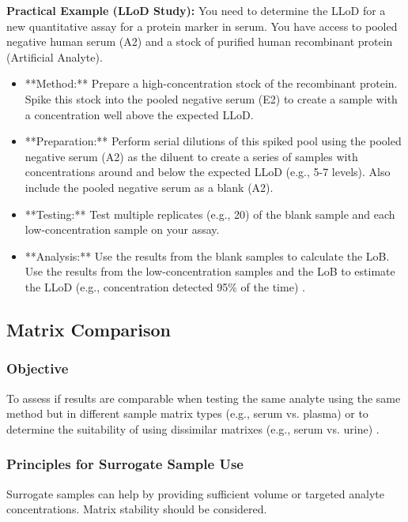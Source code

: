 \documentclass{article}
\begin{document}
\textbf{Practical Example (LLoD Study):}
You need to determine the LLoD for a new quantitative assay for a protein marker in serum. You have access to pooled negative human serum (A2) and a stock of purified human recombinant protein (Artificial Analyte).
\begin{itemize}
    \item **Method:** Prepare a high-concentration stock of the recombinant protein. Spike this stock into the pooled negative serum (E2) to create a sample with a concentration well above the expected LLoD.
    \item **Preparation:** Perform serial dilutions of this spiked pool using the pooled negative serum (A2) as the diluent to create a series of samples with concentrations around and below the expected LLoD (e.g., 5-7 levels). Also include the pooled negative serum as a blank (A2).
    \item **Testing:** Test multiple replicates (e.g., 20) of the blank sample and each low-concentration sample on your assay.
    \item **Analysis:** Use the results from the blank samples to calculate the LoB. Use the results from the low-concentration samples and the LoB to estimate the LLoD (e.g., concentration detected 95\% of the time) \cite{CLSIEP17}.
\end{itemize}

\subsection{Matrix Comparison}

\subsubsection{Objective}
To assess if results are comparable when testing the same analyte using the same method but in different sample matrix types (e.g., serum vs. plasma) or to determine the suitability of using dissimilar matrixes (e.g., serum vs. urine) \cite{CLSIEP35}.

\subsubsection{Principles for Surrogate Sample Use}
Surrogate samples can help by providing sufficient volume or targeted analyte concentrations. Matrix stability should be considered.
\end{document}
